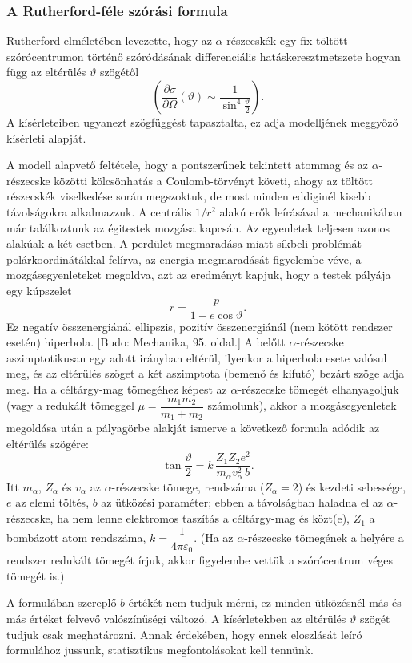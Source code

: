 \documentclass[a4paper,12pt]{article}
\begin{document}
\subsubsection{A Rutherford-féle szórási formula}
Rutherford elméletében levezette, hogy az $\alpha$-részecskék egy fix
töltött szórócentrumon történő szóródásának differenciális
hatáskeresztmetszete hogyan függ az eltérülés $\vartheta$ szögétől
\[
\left(\frac{\partial\sigma}{\partial\Omega}(\vartheta)\sim\frac{1}{\sin^4\!\tfrac{\vartheta}{2}}\right).
\]
A kísérleteiben ugyanezt szögfüggést tapasztalta, ez adja modelljének
meggyőző kísérleti alapját.

A modell alapvető feltétele, hogy a pontszerűnek tekintett atommag és az
$\alpha$-részecske közötti kölcsönhatás a Coulomb-törvényt követi, ahogy az
töltött részecskék viselkedése során megszoktuk, de most minden eddiginél
kisebb távolságokra alkalmazzuk.
A centrális $1/r^2$ alakú erők leírásával a mechanikában már találkoztunk
az égitestek mozgása kapcsán.
Az egyenletek teljesen azonos alakúak a két esetben.
A perdület megmaradása miatt síkbeli problémát polárkoordinátákkal
felírva, az energia megmaradását figyelembe véve, a mozgásegyenleteket
megoldva, azt az eredményt kapjuk, hogy a testek pályája egy kúpszelet
\[
r=\frac{p}{1-e\cos\vartheta}.
\]
Ez negatív összenergiánál ellipszis, pozitív összenergiánál (nem kötött
rendszer esetén) hiperbola.
[Budo: Mechanika, 95. oldal.]
A belőtt $\alpha$-részecske aszimptotikusan egy adott irányban eltérül,
ilyenkor a hiperbola esete valósul meg, és az eltérülés szöget a két
aszimptota (bemenő és kifutó) bezárt szöge adja meg.
Ha a céltárgy-mag tömegéhez képest az $\alpha$-részecske tömegét
elhanyagoljuk (vagy a redukált tömeggel
$\mu=\dfrac{m_1 m_2}{m_1+m_2}$ számolunk), akkor a mozgásegyenletek
megoldása után a pályagörbe alakját ismerve a következő formula adódik
az eltérülés szögére:
\[
\tan\frac{\vartheta}{2}
= k\,\frac{Z_1 Z_2 e^2}{m_\alpha v_\alpha^2\, b}.
\]
Itt $m_\alpha$, $Z_\alpha$ és $v_\alpha$ az $\alpha$-részecske tömege,
rendszáma ($Z_\alpha=2$) és kezdeti sebessége, $e$ az elemi töltés,
$b$ az ütközési paraméter;
ebben a távolságban haladna el az $\alpha$-részecske, ha nem lenne
elektromos taszítás a céltárgy-mag és közt(e),
$Z_1$ a bombázott atom rendszáma, $k=\dfrac{1}{4\pi\varepsilon_0}$.
(Ha az $\alpha$-részecske tömegének a helyére a rendszer redukált
tömegét írjuk, akkor figyelembe vettük a szórócentrum véges tömegét is.)

A formulában szereplő $b$ értékét nem tudjuk mérni, ez minden ütközésnél
más és más értéket felvevő valószínűségi változó.
A kísérletekben az eltérülés $\vartheta$ szögét tudjuk csak
meghatározni.
Annak érdekében, hogy ennek eloszlását leíró formulához jussunk,
statisztikus megfontolásokat kell tennünk.
\end{document}
